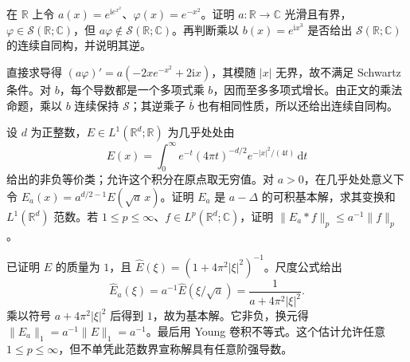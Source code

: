 \begin{exercise}\label{b2:ex:05-fast-multiplier}
在 \(\mathbb R\) 上令 \(a(x)=e^{\mathrm{i}e^{x^2}}\)、\(\varphi(x)=e^{-x^2}\)。证明 \(a\colon\mathbb R\to\mathbb C\) 光滑且有界，\(\varphi\in\mathcal S(\mathbb R;\mathbb C)\)，但 \(a\varphi\notin\mathcal S(\mathbb R;\mathbb C)\)。再判断乘以 \(b(x)=e^{\mathrm{i}x^3}\) 是否给出 \(\mathcal S(\mathbb R;\mathbb C)\) 的连续自同构，并说明其逆。
\end{exercise}
\begin{solution}
直接求导得 \((a\varphi)'=a(-2xe^{-x^2}+2\mathrm{i}x)\)，其模随 \(|x|\) 无界，故不满足 Schwartz 条件。对 \(b\)，每个导数都是一个多项式乘 \(b\)，因而至多多项式增长。由正文的乘法命题，乘以 \(b\) 连续保持 \(\mathcal S\)；其逆乘子 \(\overline b\) 也有相同性质，所以还给出连续自同构。
\end{solution}

\begin{exercise}\label{b2:ex:05-resolvent-scale}
设 \(d\) 为正整数，\(E\in L^1(\mathbb R^d;\mathbb R)\) 为几乎处处由
\[
 E(x)=\int_0^\infty e^{-t}(4\pi t)^{-d/2}e^{-|x|^2/(4t)}\,\mathrm dt
\]
给出的非负等价类；允许这个积分在原点取无穷值。对 \(a>0\)，在几乎处处意义下令 \(E_a(x)=a^{d/2-1}E(\sqrt a\,x)\)。证明 \(E_a\) 是 \(a-\Delta\) 的可积基本解，求其变换和 \(L^1(\mathbb R^d)\) 范数。若 \(1\leq p\leq\infty\)、\(f\in L^p(\mathbb R^d;\mathbb C)\)，证明 \(\|E_a*f\|_p\leq a^{-1}\|f\|_p\)。
\end{exercise}
\begin{solution}
已证明 \(E\) 的质量为 \(1\)，且 \(\widehat E(\xi)=(1+4\pi^2|\xi|^2)^{-1}\)。尺度公式给出
\[
 \widehat E_a(\xi)=a^{-1}\widehat E(\xi/\sqrt a)
 =\dfrac1{a+4\pi^2|\xi|^2}.
\]
乘以符号 \(a+4\pi^2|\xi|^2\) 后得到 \(1\)，故为基本解。它非负，换元得 \(\|E_a\|_1=a^{-1}\|E\|_1=a^{-1}\)。最后用 Young 卷积不等式。这个估计允许任意 \(1\leq p\leq\infty\)，但不单凭此范数界宣称解具有任意阶强导数。
\end{solution}

